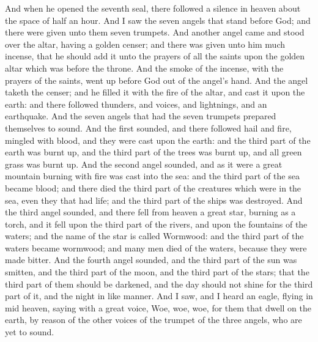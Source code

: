 And when he opened the seventh seal, there followed a silence in heaven about the space of half an hour. And I saw the seven angels that stand before God; and there were given unto them seven trumpets.  And another angel came and stood over the altar, having a golden censer; and there was given unto him much incense, that he should add it unto the prayers of all the saints upon the golden altar which was before the throne. And the smoke of the incense, with the prayers of the saints, went up before God out of the angel’s hand. And the angel taketh the censer; and he filled it with the fire of the altar, and cast it upon the earth: and there followed thunders, and voices, and lightnings, and an earthquake.  And the seven angels that had the seven trumpets prepared themselves to sound.  And the first sounded, and there followed hail and fire, mingled with blood, and they were cast upon the earth: and the third part of the earth was burnt up, and the third part of the trees was burnt up, and all green grass was burnt up.  And the second angel sounded, and as it were a great mountain burning with fire was cast into the sea: and the third part of the sea became blood; and there died the third part of the creatures which were in the sea, even they that had life; and the third part of the ships was destroyed.  And the third angel sounded, and there fell from heaven a great star, burning as a torch, and it fell upon the third part of the rivers, and upon the fountains of the waters; and the name of the star is called Wormwood: and the third part of the waters became wormwood; and many men died of the waters, because they were made bitter.  And the fourth angel sounded, and the third part of the sun was smitten, and the third part of the moon, and the third part of the stars; that the third part of them should be darkened, and the day should not shine for the third part of it, and the night in like manner.  And I saw, and I heard an eagle, flying in mid heaven, saying with a great voice, Woe, woe, woe, for them that dwell on the earth, by reason of the other voices of the trumpet of the three angels, who are yet to sound. 

